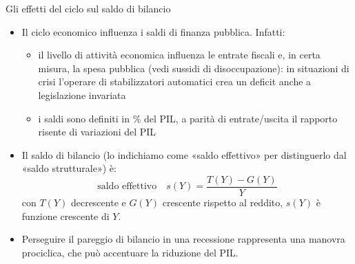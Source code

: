 \documentclass[aspectratio=149,11pt,italian]{beamer}
\begin{document}
\begin{frame}{Gli effetti del ciclo sul saldo di bilancio}

  \begin{itemize}
  \item Il ciclo economico influenza i saldi di finanza pubblica. Infatti:
    \begin{itemize}
    \item il livello di attività economica influenza le entrate fiscali e, in
      certa misura, la spesa pubblica (vedi sussidi di disoccupazione): in
      situazioni di crisi l'operare di \alert{stabilizzatori automatici} crea
      un deficit anche a legislazione invariata
    \item i saldi sono definiti in \% del PIL, a parità di entrate/uscita il
      rapporto risente di variazioni del PIL
    \end{itemize}
  \item Il saldo di bilancio (lo indichiamo come «saldo effettivo» per
    distinguerlo dal «saldo strutturale») è:
    \begin{equation*}
      \text{saldo effettivo}\quad s(Y)=\frac{T(Y)-G(Y)}{Y}
    \end{equation*}
    con $T(Y)$ decrescente e $G(Y)$ crescente rispetto al reddito, $s(Y)$ è
    funzione crescente di $Y$.
  \item Perseguire il pareggio di bilancio in una recessione rappresenta una manovra
    \alert{prociclica}, che può accentuare la riduzione del PIL.
  \end{itemize}
\end{frame}
\end{document}
